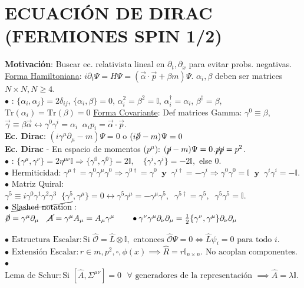 \section{ECUACIÓN DE DIRAC (FERMIONES SPIN 1/2)}
\textbf{Motivación}: Buscar ec. relativista lineal en $\partial_t, \partial_x$ para evitar probs. negativas.\\
\underline{Forma Hamiltoniana}: $i\partial_t \Psi = H\Psi = (\vec{\alpha} \cdot \vec{p} + \beta m)\Psi$. $\alpha_i, \beta$ deben ser matrices $N\times N, N\ge 4$.\\
$\bullet$ : $\{\alpha_i, \alpha_j\} = 2\delta_{ij}$, $\{\alpha_i, \beta\} = 0$, $\alpha
_i^2\!=\!\beta^2 = \mathbb{I}$, $\alpha_i^\dagger = \alpha_i$, $\beta^\dagger = \beta$, $\text{Tr}(\alpha_i)\!=\!\text{Tr}(\beta)=0$
\underline{Forma Covariante}:
Def matrices Gamma: $\gamma^0 \equiv \beta$, $\vec{\gamma} \equiv \beta\vec{\alpha}\leftrightarrow \gamma^0 \gamma^i = \alpha_i\;\; \alpha_i p_i = \vec{\alpha}\cdot\vec{p}$.\\
\textbf{Ec. Dirac}: $(i\gamma^\mu \partial_\mu - m)\Psi = 0$ o $(i\cancel{\partial} - m)\Psi = 0$\\
\textbf{Ec. Dirac} - En espacio de momentos ($p^\mu$): $(\cancel{p} - m)\Psi = 0$.\qquad $\cancel{p}\cancel{p}=p^2$.\\
$\bullet$ : $\{\gamma^\mu, \gamma^\nu\} = 2\eta^{\mu\nu}\mathbb{I} \Rightarrow \{\gamma^0, \gamma^0\}= 2\mathbb{I}, \quad \{\gamma^i, \gamma^i\} = -2\mathbb{I},$ \;\;else 0.\\
$\bullet$ Hermiticidad: $\gamma^{\mu\dagger} = \gamma^0 \gamma^\mu \gamma^0 \Rightarrow \gamma^{0\dagger} = \gamma^0  \;\; \textbf{y}\;\; \gamma^{i\dagger} = -\gamma^i \Rightarrow \gamma^0 \gamma^0 = \mathbb{I} \;\;\textbf{y} \;\; \gamma^i\gamma^i=-\mathbb{I}$.\\
$\bullet$ Matriz Quiral: $\gamma^5 \equiv i\gamma^0\gamma^1\gamma^2\gamma^3\;\; \{\gamma^5, \gamma^\mu\} = 0\!\leftrightarrow\!\gamma^5\gamma^\mu = - \gamma^\mu \gamma^5, \;\; \gamma^{5\dagger} = \gamma^5, \;\; \gamma^5\gamma^5 = \mathbb{I}$.\\
$\bullet$ $\cancel{\text{Slashed notation}}:$ $\cancel{\partial} = \gamma^\mu \partial_\mu \quad \cancel{A} = \gamma^\mu A_\mu = A_\mu \gamma^\mu \qquad \bullet \gamma^\nu \gamma^\mu \partial_\nu \partial_\mu = \frac{1}{2} \{\gamma^\nu, \gamma^\mu\} \partial_\nu \partial_\mu$ 



$\bullet$ $\text{Estructura Escalar}: \text{Si } \hat{\mathcal{O}} = \hat{L} \otimes \mathbb{I}, \text{ entonces } \hat{\mathcal{O}}\Psi = 0 \iff \hat{L}\psi_i = 0 \text{ para todo } i. $\\
$\bullet$ $\text{Extensión Escalar}: r \in {m, p^2, \square, \phi(x)} \implies \hat{R} = r \mathbb{I}_{n \times n}. \text{ No acoplan componentes.} $\\
$\bullet$ $\text{Lema de Schur}: \text{Si } [ \hat{A}, \Sigma^{\mu\nu} ] = 0 \text{ $\forall$ generadores de la representación }\implies \hat{A} = \lambda \mathbb{I}.$ \



